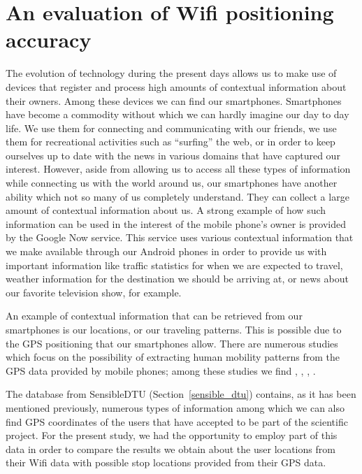 \chapter{An evaluation of Wifi positioning accuracy} 

The evolution of technology during the present days allows us to make use of
devices that register and process high amounts of contextual information about
their owners. Among these devices we can find our smartphones. Smartphones have
become a commodity without which we can hardly imagine our day to day life. We
use them for connecting and communicating with our friends, we use them for
recreational activities such as ``surfing'' the web, or in order to keep
ourselves up to date with the news in various domains that have captured our
interest. However, aside from allowing us to access all these types of
information while connecting us with the world around us, our smartphones have
another ability which not so many of us completely understand. They can collect
a large amount of contextual information about us. A strong example of how such
information can be used in the interest of the mobile phone's owner is provided
by the Google Now \cite{GN} service. This service uses various contextual
information that we make available through our Android phones in order to
provide us with important information like traffic statistics for when we are
expected to travel, weather information for the destination we should be
arriving at, or news about our favorite television show, for example.

An example of contextual information that can be retrieved from our smartphones
is our locations, or our traveling patterns. This is possible due to the GPS
positioning that our smartphones allow. There are numerous studies which focus
on the possibility of extracting human mobility patterns from the GPS data
provided by mobile phones; among these studies we find
\cite{Montoliu:2010:DHP:1899475.1899487},
\cite{cuttone2014inferring},
\cite{Zhou:2007:DPM:1247715.1247718}, \cite{Ashbrook:2003:UGL:945305.945310}.

The database from SensibleDTU (Section~\ref{sensible_dtu}) contains, as it has
been mentioned previously, numerous types of information among which we can also
find GPS coordinates of the users that have accepted to be part of the
scientific project. For the present study, we had the opportunity to employ part
of this data in order to compare the results we obtain about the user locations
from their Wifi data with possible stop locations provided from their GPS data.


